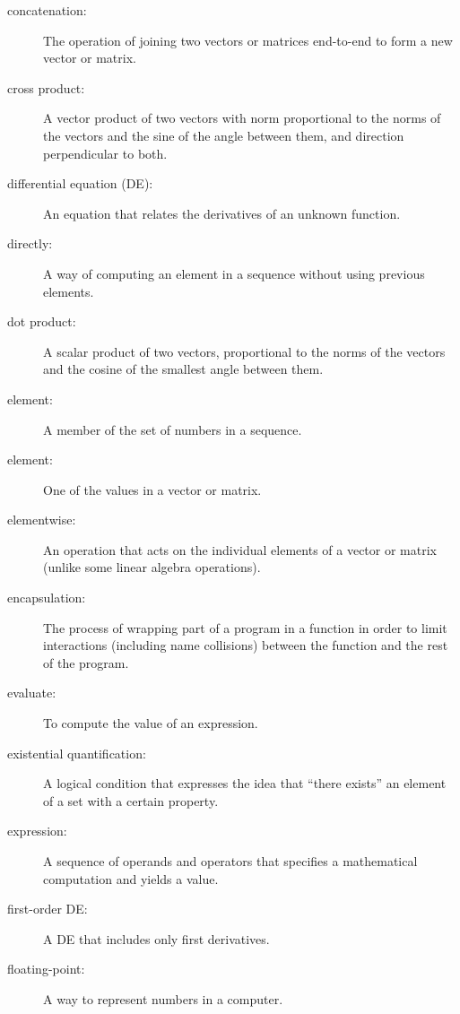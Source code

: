 \begin{description}
\item[concatenation:] The operation of joining two vectors or matrices end-to-end to
form a new vector or matrix.

\item[cross product:] A vector product of two vectors with norm
proportional to the norms of the vectors and the sine of the angle
between them, and direction perpendicular to both.

\item[differential equation (DE):] An equation that relates the
derivatives of an unknown function.

\item[directly:] A way of computing an element in a sequence without
using previous elements.

\item[dot product:] A scalar product of two vectors, proportional to the
norms of the vectors and the cosine of the smallest angle between them.

\item[element:] A member of the set of numbers in a sequence.

\item[element:] One of the values in a vector or matrix.

\item[elementwise:] An operation that acts on the individual elements
of a vector or matrix (unlike some linear algebra operations).

\item[encapsulation:] The process of wrapping part of a program in
a function in order to limit interactions (including name collisions)
between the function and the rest of the program.

\item[evaluate:] To compute the value of an expression.

\item[existential quantification:] A logical condition that expresses the idea that ``there exists'' an element of a set with a certain property.

\item[expression:] A sequence of operands and operators that specifies
a mathematical computation and yields a value.

\item[first-order DE:] A DE that includes only first derivatives.

\item[floating-point:] A way to represent numbers in a computer.


\end{description}
